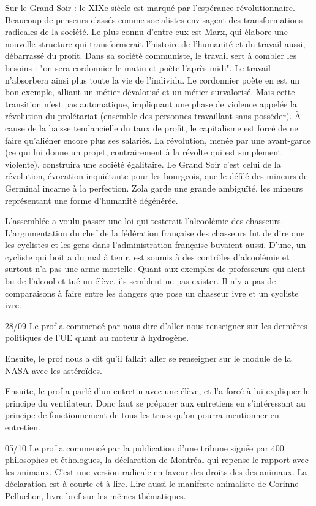 \documentclass[a4paper,12pt]{book}
\begin{document}
\par Sur le Grand Soir : le XIXe siècle est marqué par l'espérance révolutionnaire. Beaucoup de penseurs classés comme socialistes envisagent des transformations radicales de la société. Le plus connu d'entre eux est Marx, qui élabore une nouvelle structure qui transformerait l'histoire de l'humanité et du travail aussi, débarrassé du profit. Dans sa société communiste, le travail sert à combler les besoins : "on sera cordonnier le matin et poète l'après-midi". Le travail n'absorbera ainsi plus toute la vie de l'individu. Le cordonnier poète en est un bon exemple, alliant un métier dévalorisé et un métier survalorisé. Mais cette transition n'est pas automatique, impliquant une phase de violence appelée la révolution du prolétariat (ensemble des personnes travaillant sans posséder). À cause de la baisse tendancielle du taux de profit, le capitalisme est forcé de ne faire qu'aliéner encore plus ses salariés. La révolution, menée par une avant-garde (ce qui lui donne un projet, contrairement à la révolte qui est simplement violente), construira une société égalitaire. Le Grand Soir c'est celui de la révolution, évocation inquiétante pour les bourgeois, que le défilé des mineurs de Germinal incarne à la perfection. Zola garde une grande ambiguïté, les mineurs représentant une forme d'humanité dégénérée.
\par L'assemblée a voulu passer une loi qui testerait l'alcoolémie des chasseurs. L'argumentation du chef de la fédération française des chasseurs fut de dire que les cyclistes et les gens dans l'administration française buvaient aussi. D'une, un cycliste qui boit a du mal à tenir, est soumis à des contrôles d'alcoolémie et surtout n'a pas une arme mortelle. Quant aux exemples de professeurs qui aient bu de l'alcool et tué un élève, ils semblent ne pas exister. Il n'y a pas de comparaisons à faire entre les dangers que pose un chasseur ivre et un cycliste ivre.
\par 28/09 Le prof a commencé par nous dire d'aller nous renseigner sur les dernières politiques de l'UE quant au moteur à hydrogène.
\par Ensuite, le prof nous a dit qu'il fallait aller se renseigner sur le module de la NASA avec les astéroïdes.
\par Ensuite, le prof a parlé d'un entretin avec une élève, et l'a forcé à lui expliquer le principe du ventilateur. Donc faut se préparer aux entretiens en s'intéressant au principe de fonctionnement de tous les trucs qu'on pourra mentionner en entretien.
\par 05/10 Le prof a commencé par la publication d'une tribune signée par 400 philosophes et éthologues, la déclaration de Montréal qui repense le rapport avec les animaux. C'est une version radicale en faveur des droits des des animaux. La déclaration est à courte et à lire. Lire aussi le manifeste animaliste de Corinne Pelluchon, livre bref sur les mêmes thématiques.
\end{document}
